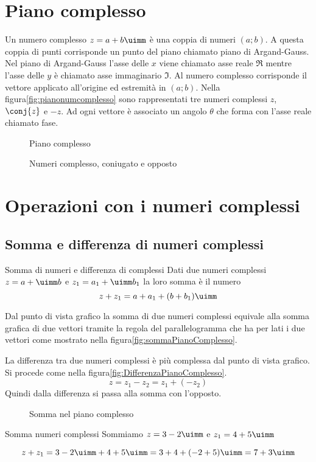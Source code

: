 \section{Piano complesso}
Un numero complesso $z=a+b\uimm$ è una coppia di numeri $(a;b)$. A questa coppia di punti corrisponde un punto del piano chiamato piano di  Argand-Gauss. 
Nel piano di Argand-Gauss l'asse delle $x$ viene chiamato asse reale $\Re$ mentre l'asse delle $y$ è chiamato asse immaginario $\Im$.
Al numero complesso corrisponde il vettore applicato all'origine ed estremità in $(a;b)$. Nella figura\nobs\vref{fig:pianonumcomplesso} sono rappresentati tre numeri complessi $z$, $\conj{z}$ e $-z$. Ad ogni vettore è associato un angolo $\theta$ che forma con l'asse reale chiamato fase. 
\begin{figure}
	\centering
	
	\caption{Piano complesso}
	\label{fig:nuncomplPianoComplesso}
\end{figure}
\begin{figure} %
	\centering

	\caption{Numeri complesso, coniugato e opposto}
	\label{fig:pianonumcomplesso}
\end{figure}
\section{Operazioni con i numeri complessi}
\label{sec:NumCompOperazioni}
\subsection{Somma e differenza di numeri complessi}
\begin{definizionet}{Somma di numeri e differenza di complessi}{}
Dati due numeri complessi  $z=a+\uimm b$ e  $z_1=a_1+\uimm b_1$ la loro somma è il numero \[z+z_1=a+a_1+(b+b_1)\uimm\]
\end{definizionet}
Dal punto di vista grafico la somma di due numeri complessi equivale alla somma grafica di due vettori tramite la regola del parallelogramma che ha per lati i due vettori come mostrato nella figura\nobs\vref{fig:sommaPianoComplesso}.

La differenza tra due numeri complessi è più complessa dal punto di vista grafico. Si procede come nella figura\nobs\vref{fig:DifferenzaPianoComplesso}. \[ z=z_1-z_2=z_1+(-z_2)\]  Quindi dalla differenza si passa alla somma con l'opposto.
\begin{figure}
	\centering
	
	\caption{Somma nel piano complesso}
	\label{fig:sommaPianoComplesso}
\end{figure}
\begin{esempiot}{Somma numeri complessi}{}
Sommiamo $z=3-2\uimm$ e $z_1=4+5\uimm$
\end{esempiot}
	\[z+z_1=3-2\uimm +4+5\uimm=3+4+(-2+5)\uimm=7+3\uimm\]

